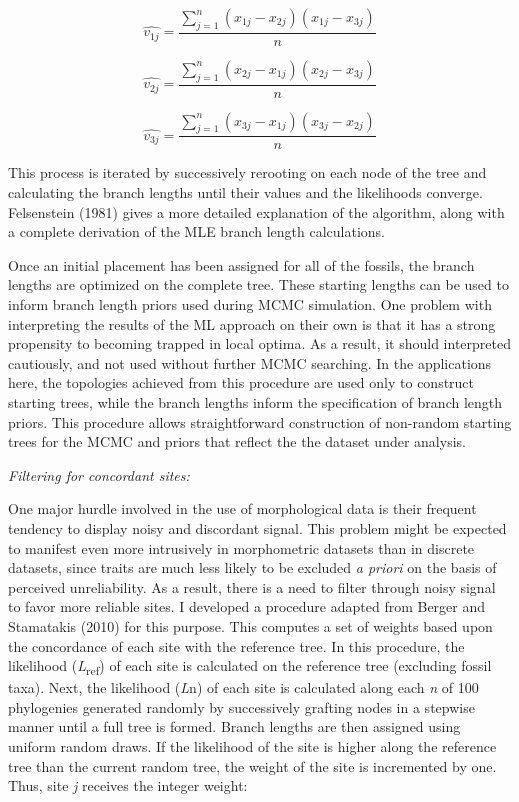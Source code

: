 \documentclass[12pt]{article}
\providecommand{\DIFadd}[1]{{\protect\color{blue}\uwave{#1}}} %
\providecommand{\DIFaddbegin}{} %
\providecommand{\DIFaddend}{} %
\newcommand{\DIFaddincludegraphics}[2][]{{\color{blue}\fbox{\DIFOincludegraphics[#1]{#2}}}} %
\DeclareRobustCommand{\DIFaddbegin}{\DIFOaddbegin \let\includegraphics\DIFaddincludegraphics} %
\DeclareRobustCommand{\DIFaddend}{\DIFOaddend \let\includegraphics\DIFOincludegraphics} %
\begin{document}
\begin{equation}
 \hat{v_{1j}} =   \frac{\sum\limits_{j=1}^{n}(x_{1j}- x_{2j}) (x_{1j} - x_{3j}) }{n}
\end{equation}

\begin{equation}
 \hat{v_{2j}} =   \frac{\sum\limits_{j=1}^{n}(x_{2j}- x_{1j}) (x_{2j} - x_{3j})}{n} 
\end{equation}

\begin{equation}
\hat{v_{3j}} =   \frac{\sum\limits_{j=1}^{n}(x_{3j}- x_{1j}) (x_{3j} - x_{2j})}{n}
\end{equation}


This process is iterated by successively rerooting on each node of the
tree and calculating the branch lengths until their values and the
likelihoods converge. Felsenstein (1981) gives a more detailed
explanation of the algorithm, along with a complete derivation of the MLE branch length calculations.

Once an initial placement has been assigned for  all of the fossils,
the branch lengths are optimized on the complete tree. These starting lengths can be used to inform branch
length priors used during MCMC simulation. One problem with interpreting
the results of the ML approach on their own is that it has a strong
propensity to becoming trapped in local optima. As a result, it should \DIFaddbegin \DIFadd{be
}\DIFaddend interpreted cautiously, and not used without further MCMC searching. In the
applications here, the topologies achieved from this procedure are
used only to construct  starting trees, while the branch
lengths inform the specification of branch length priors. This procedure
allows straightforward construction of non-random starting trees for the
MCMC and priors that reflect the the dataset under analysis.

\emph{Filtering for concordant sites:}

One major hurdle involved in the use of morphological data is their
frequent tendency to display noisy and discordant signal. This problem
might be expected to manifest even more intrusively in morphometric
datasets than in discrete datasets, since traits are much less likely to
be excluded \emph{a priori} on the basis of perceived unreliability. As
a result, there is a need to filter through noisy signal to favor more
reliable sites. I developed a procedure adapted from Berger and
Stamatakis (2010) for this purpose. This computes a set of weights based
upon the concordance of each site with the reference tree. In this
procedure, the likelihood (\emph{L}\textsubscript{ref}) of each site is calculated on
the reference tree (excluding fossil taxa). Next, the likelihood
(\emph{L}n) of each site is calculated along each \emph{n} of 100
 phylogenies generated randomly by  successively grafting nodes in a stepwise manner
 until a full tree is formed. Branch lengths are then assigned using uniform random draws.
  If the likelihood of the site is higher along the reference tree than the current random tree, the weight of the
site is incremented by one. Thus, site \emph{j} receives the integer
weight:
\end{document}
